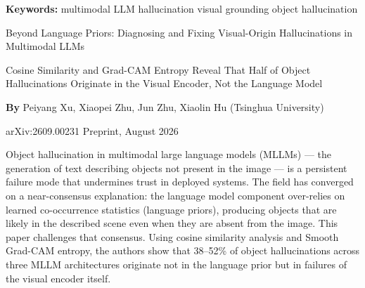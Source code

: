 \documentclass[10pt,twocolumn]{article}
\begin{document}
\setlength{\parindent}{0pt}
\setlength{\parskip}{4pt}

{\small\color{keywordgray}\textbf{Keywords:}
  multimodal LLM \textbullet{}
  hallucination \textbullet{}
  visual grounding \textbullet{}
  object hallucination}\par\vspace{4pt}

{\LARGE\bfseries\raggedright
  Beyond Language Priors: Diagnosing and Fixing
  Visual-Origin Hallucinations in Multimodal LLMs}\par\vspace{4pt}

{\large\itshape\raggedright
  Cosine Similarity and Grad-CAM Entropy Reveal
  That Half of Object Hallucinations Originate
  in the Visual Encoder, Not the Language Model}\par\vspace{6pt}

{\small\textbf{By} Peiyang Xu, Xiaopei Zhu, Jun Zhu, Xiaolin Hu
  (Tsinghua University)}\par\vspace{2pt}

{\small\color{keywordgray}arXiv:2609.00231 \textbullet{} Preprint, August 2026}
\par\vspace{2pt}\noindent{\color{rulered}\rule{\columnwidth}{0.6pt}}\vspace{6pt}

Object hallucination in multimodal large language models (MLLMs) --- the
generation of text describing objects not present in the image --- is
a persistent failure mode that undermines trust in deployed systems.
The field has converged on a near-consensus explanation: the language
model component over-relies on learned co-occurrence statistics (language
priors), producing objects that are likely in the described scene even
when they are absent from the image. This paper challenges that consensus.
Using cosine similarity analysis and Smooth Grad-CAM entropy, the authors
show that 38--52\% of object hallucinations across three MLLM architectures
originate not in the language prior but in failures of the visual encoder
itself.
\end{document}
